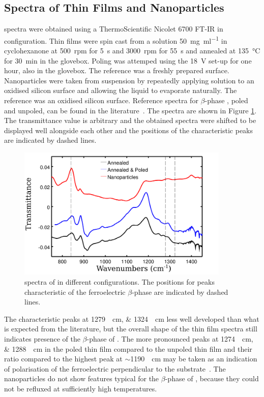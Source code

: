 \subsection{\ftir{} Spectra of \pvdf{} Thin Films and Nanoparticles}
\ftir{} spectra were obtained using a ThermoScientific Nicolet 6700 FT-IR in \atr{} \ftir{} configuration. Thin films were spin cast from a solution \SI{50}{\milli\gram\per\milli\litre} \pvdf{} in cyclohexanone at \SI{500}{rpm} for \SI{5}{\second} and \SI{3000}{rpm} for \SI{55}{\second} and annealed at \SI{135}{\degreeCelsius} for \SI{30}{\minute} in the glovebox. Poling was attemped using the \SI{18}{\volt} set-up for one hour, also in the glovebox. The reference was a freshly prepared \sih{} surface. Nanoparticles were taken from suspension by repeatedly applying solution to an oxidised silicon surface and allowing the liquid to evaporate naturally. The reference was an oxidised silicon surface. Reference \ftir{} spectra for $\beta$-phase \pvdf{}, poled and unpoled, can be found in the literature~\cite{liu_THEpaper}. The spectra are shown in Figure \ref{fig:irplot}. The transmittance value is arbitrary and the obtained spectra were shifted to be displayed well alongside each other and the positions of the characteristic peaks are indicated by dashed lines.\\
\begin{figure}
\centering
	\includegraphics[width=0.9\textwidth]{./figs/chap1/IRplot}
	\caption{\ftir{} spectra of \pvdf{} in different configurations. The positions for peaks characteristic of the ferroelectric $\beta$-phase are indicated by dashed lines.}
	\label{fig:irplot}
\end{figure}
The characteristic peaks at \SIlist{1279;1324}{\per\centi\metre} less well developed than what is expected from the literature, but the overall shape of the thin film spectra still indicates presence of the $\beta$-phase of \pvdf{}. The more pronounced peaks at \SIlist{1274;1288}{\per\centi\metre} in the poled thin film compared to the unpoled thin film and their ratio compared to the highest peak at $\sim$\SI{1190}{\per\centi\metre} may be taken as an indication of polarisation of the ferroelectric perpendicular to the substrate~\cite{mao_optim}. The nanoparticles do not show features typical for the $\beta$-phase of \pvdf{}, because they could not be refluxed at sufficiently high temperatures.
%



